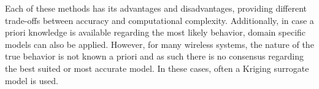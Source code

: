 




Each of these methods has its advantages and disadvantages, providing different trade-offs between accuracy and computational complexity. Additionally, in case a priori knowledge is available regarding the most likely behavior, domain specific models can also be applied. However, for many wireless systems, the nature of the true behavior is not known a priori and as such there is no consensus
regarding the best suited or most accurate model. In these cases, often a Kriging surrogate model is used. 




